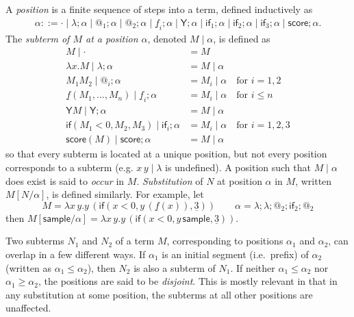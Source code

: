 \documentclass{article}
\newcommand{\tY}{\mathsf{Y}}
\newcommand{\tif}[3]{\mathsf{if}(#1, #2, #3)} %
\newcommand{\tsample}{\mathsf{sample}}
\newcommand{\tscore}{\mathsf{score}}
\theoremstyle{definition}
\theoremstyle{lemma}
\theoremstyle{remark}
\begin{document}
A \emph{position} 
is a finite sequence of steps into a term, defined inductively as
\begin{align*}
\alpha ::= \cdot \mid \lambda ; \alpha \mid @_1 ; \alpha \mid @_2 ; \alpha \mid \underline f_i ; \alpha \mid \tY ; \alpha \mid \textsf{if}_1 ; \alpha \mid \textsf{if}_2 ; \alpha \mid \textsf{if}_3 ; \alpha \mid \tscore ; \alpha.
\end{align*}
The \emph{subterm of $M$ at a position $\alpha$}, denoted $M \mid \alpha$, is defined as
\begin{align*}
M \mid \cdot & = M \\
\lambda x. M \mid \lambda ; \alpha & = M \mid \alpha \\
M_1 M_2 \mid @_i ; \alpha & = M_i \mid \alpha \quad \text{for } i = 1,2 \\
\underline f(M_1,\dots,M_n) \mid \underline f_i ; \alpha & = M_i \mid \alpha \quad \text{for }i \leq n \\
\tY M \mid \tY ; \alpha & = M \mid \alpha \\
\tif{M_1 < 0}{M_2}{M_3} \mid \textsf{if}_i ; \alpha & = M_i \mid \alpha \quad \text{for } i = 1,2,3 \\
\tscore(M) \mid \tscore ; \alpha & = M \mid \alpha
\end{align*}
so that every subterm is located at a unique position, but not every position corresponds to a subterm (e.g. $x \, y \mid \lambda$ is undefined). 
A position such that $M\mid \alpha$ does exist is said to \emph{occur} in $M$. 
\emph{Substitution} of $N$ at position $\alpha$ in $M$, written $M[N/\alpha]$, is defined similarly.
For example, let 
\[
M = \lambda x \, y. y \, (\tif{x < 0}{y \, (\underline f (x))}{\underline 3})
\qquad
\alpha =\lambda ; \lambda ; @_2 ; \textsf{if}_2 ; @_2
\]
then 
\(
M[\tsample / \alpha] = \lambda x \, y. y \, (\tif{x < 0}{y \, \tsample}{\underline 3}).
\)

Two subterms $N_1$ and $N_2$ of a term $M$, corresponding to positions $\alpha_1$ and $\alpha_2$, can overlap in a few different ways. 
If $\alpha_1$ is an initial segment (i.e.~prefix) of $\alpha_2$ (written as $\alpha_1 \leq \alpha_2$), then $N_2$ is also a subterm of $N_1$. If neither $\alpha_1 \leq \alpha_2$ nor $\alpha_1 \geq \alpha_2$, the positions are said to be \emph{disjoint}. 
This is mostly relevant in that in any substitution at some position, the subterms at all other positions are unaffected. 
\end{document}
